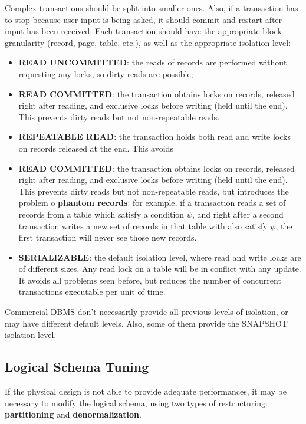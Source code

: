 Complex transactions should be split into smaller ones. Also, if a transaction has to stop because user input is being asked, it should commit and restart after input has been received. Each transaction should have the appropriate block granularity (record, page, table, etc.), as well as the appropriate isolation level:
\begin{itemize}
    \item \textbf{READ UNCOMMITTED}: the reads of records are performed without requesting any locks, so dirty reads are possible;

    \item \textbf{READ COMMITTED}: the transaction obtains locks on records, released right after reading, and exclusive locks before writing (held until the end). This prevents dirty reads but not non-repeatable reads.

    \item \textbf{REPEATABLE READ}: the transaction holds both read and write locks on records released at the end. This avoids     \item \textbf{READ COMMITTED}: the transaction obtains locks on records, released right after reading, and exclusive locks before writing (held until the end). This prevents dirty reads but not non-repeatable reads, but introduces the problem o \textbf{phantom records}: for example, if a transaction reads a set of records from a table which satisfy a condition $\psi$, and right after a second transaction writes a new set of records in that table with also satisfy $\psi$, the first transaction will never see those new records.

    \item \textbf{SERIALIZABLE}: the default isolation level, where read and write locks are of different sizes. Any read lock on a table will be in conflict with any update. It avoids all problems seen before, but reduces the number of concurrent transactions executable per unit of time.
\end{itemize}
Commercial DBMS don't necessarily provide all previous levels of isolation, or may have different default levels. Also, some of them provide the SNAPSHOT isolation level.

\subsection{Logical Schema Tuning}

If the physical design is not able to provide adequate performances, it may be necessary to modify the logical schema, using two types of restructuring: \textbf{partitioning} and \textbf{denormalization}.

